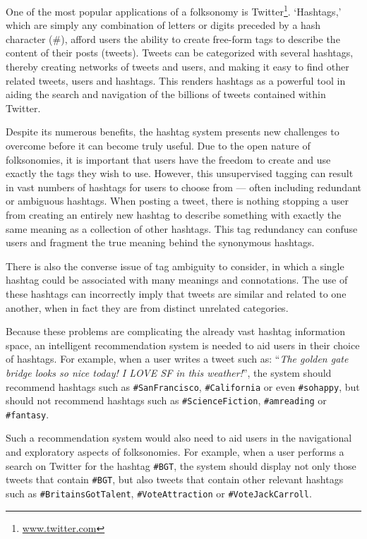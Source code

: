 \documentclass[11pt,a4paper]{report}
\begin{document}
One of the most popular applications of a folksonomy is Twitter\footnote{\url{www.twitter.com}}. `Hashtags,' which are simply any combination of letters or digits preceded by a hash character (\#), afford users the ability to create free-form tags to describe the content of their posts (tweets). Tweets can be categorized with several hashtags, thereby creating networks of tweets and users, and making it easy to find other related tweets, users and hashtags. This renders hashtags as a powerful tool in aiding the search and navigation of the billions of tweets contained within Twitter.

Despite its numerous benefits, the hashtag system presents new challenges to overcome before it can become truly useful. Due to the open nature of folksonomies, it is important that users have the freedom to create and use exactly the tags they wish to use. However, this unsupervised tagging can result in vast numbers of hashtags for users to choose from --- often including redundant or ambiguous hashtags. When posting a tweet, there is nothing stopping a user from creating an entirely new hashtag to describe something with exactly the same meaning as a collection of other hashtags. This tag redundancy can confuse users and fragment the true meaning behind the synonymous hashtags.

There is also the converse issue of tag ambiguity to consider, in which a single hashtag could be associated with many meanings and connotations. The use of these hashtags can incorrectly imply that tweets are similar and related to one another, when in fact they are from distinct unrelated categories.

Because these problems are complicating the already vast hashtag information space, an intelligent recommendation system is needed to aid users in their choice of hashtags. For example, when a user writes a tweet such as: ``\emph{The golden gate bridge looks so nice today! I LOVE SF in this weather!}'', the system should recommend hashtags such as \texttt{\#SanFrancisco}, \texttt{\#California} or even \texttt{\#sohappy}, but should not recommend hashtags such as \texttt{\#ScienceFiction}, \texttt{\#amreading} or \texttt{\#fantasy}.

Such a recommendation system would also need to aid users in the navigational and exploratory aspects of folksonomies. For example, when a user performs a search on Twitter for the hashtag \texttt{\#BGT}, the system should display not only those tweets that contain \texttt{\#BGT}, but also tweets that contain other relevant hashtags such as \texttt{\#BritainsGotTalent}, \texttt{\#VoteAttraction} or \texttt{\#VoteJackCarroll}.
\end{document}
